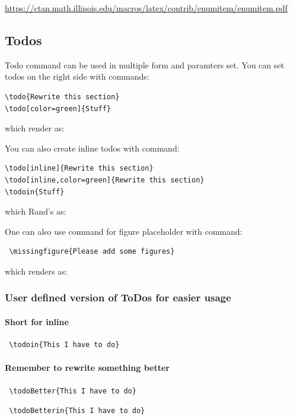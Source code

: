 \url{https://ctan.math.illinois.edu/macros/latex/contrib/enumitem/enumitem.pdf}

\subsection{Todos}

Todo command can be used in multiple form and paramters set. You can set todos on the right side with commands:
{\small
\begin{verbatim}
\todo{Rewrite this section}
\todo[color=green]{Stuff}
\end{verbatim}
} which render as:




You can also create inline todos with command:
{\small
\begin{verbatim}
\todo[inline]{Rewrite this section}
\todo[inline,color=green]{Rewrite this section}
\todoin{Stuff}
\end{verbatim}
} which Rand's as:

One can also use command for figure placeholder with command:
{\small
\begin{verbatim}
 \missingfigure{Please add some figures}
\end{verbatim}
} which renders as:


\subsubsection{User defined version of ToDos for easier usage}

\paragraph{Short for inline}
\begin{verbatim}
 \todoin{This I have to do}
\end{verbatim}

\paragraph{Remember to rewrite something better}
\begin{verbatim}
 \todoBetter{This I have to do}
\end{verbatim}
\begin{verbatim}
 \todoBetterin{This I have to do}
\end{verbatim}

